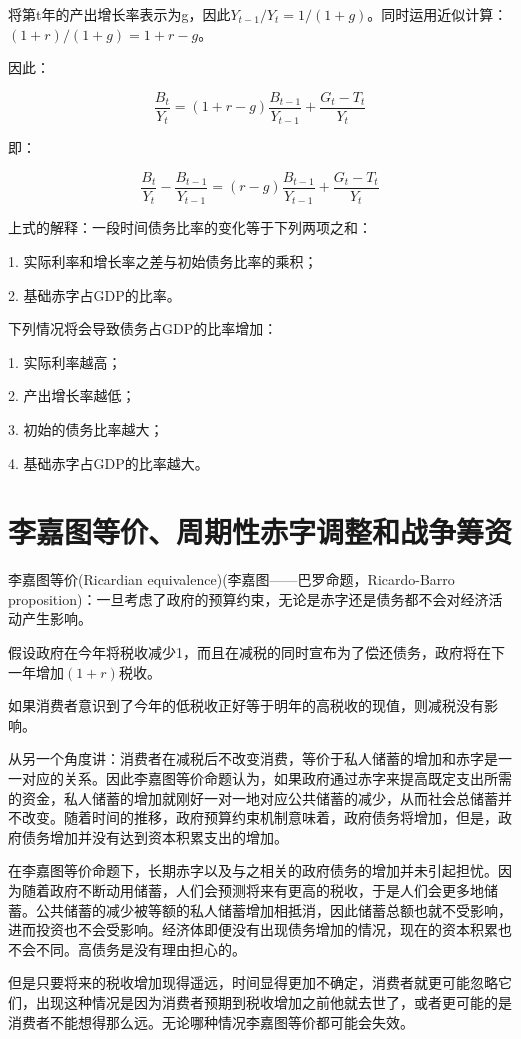 \documentclass{article}
\begin{document}
将第t年的产出增长率表示为g，因此$ Y_{t-1}/Y_t=1/(1+g) $。同时运用近似计算：$ (1+r)/(1+g)=1+r-g $。

因此：

\[
\frac{B_t}{Y_t}=(1+r-g)\frac{B_{t-1}}{Y_{t-1}}+\frac{G_t-T_t}{Y_t}
\]

即：

\[
\frac{B_t}{Y_t}-\frac{B_{t-1}}{Y_{t-1}}=(r-g)\frac{B_{t-1}}{Y_{t-1}}+\frac{G_t-T_t}{Y_t}
\]

上式的解释：一段时间债务比率的变化等于下列两项之和：

1. 实际利率和增长率之差与初始债务比率的乘积；

2. 基础赤字占GDP的比率。

\hspace*{\fill}

下列情况将会导致债务占GDP的比率增加：

1. 实际利率越高；

2. 产出增长率越低；

3. 初始的债务比率越大；

4. 基础赤字占GDP的比率越大。

\section{李嘉图等价、周期性赤字调整和战争筹资}

李嘉图等价(Ricardian equivalence)(李嘉图——巴罗命题，Ricardo-Barro proposition)：一旦考虑了政府的预算约束，无论是赤字还是债务都不会对经济活动产生影响。

假设政府在今年将税收减少1，而且在减税的同时宣布为了偿还债务，政府将在下一年增加$ (1+r) $税收。

如果消费者意识到了今年的低税收正好等于明年的高税收的现值，则减税没有影响。

从另一个角度讲：消费者在减税后不改变消费，等价于私人储蓄的增加和赤字是一一对应的关系。因此李嘉图等价命题认为，如果政府通过赤字来提高既定支出所需的资金，私人储蓄的增加就刚好一对一地对应公共储蓄的减少，从而社会总储蓄并不改变。随着时间的推移，政府预算约束机制意味着，政府债务将增加，但是，政府债务增加并没有达到资本积累支出的增加。

在李嘉图等价命题下，长期赤字以及与之相关的政府债务的增加并未引起担忧。因为随着政府不断动用储蓄，人们会预测将来有更高的税收，于是人们会更多地储蓄。公共储蓄的减少被等额的私人储蓄增加相抵消，因此储蓄总额也就不受影响，进而投资也不会受影响。经济体即便没有出现债务增加的情况，现在的资本积累也不会不同。高债务是没有理由担心的。

但是只要将来的税收增加现得遥远，时间显得更加不确定，消费者就更可能忽略它们，出现这种情况是因为消费者预期到税收增加之前他就去世了，或者更可能的是消费者不能想得那么远。无论哪种情况李嘉图等价都可能会失效。
\end{document}
